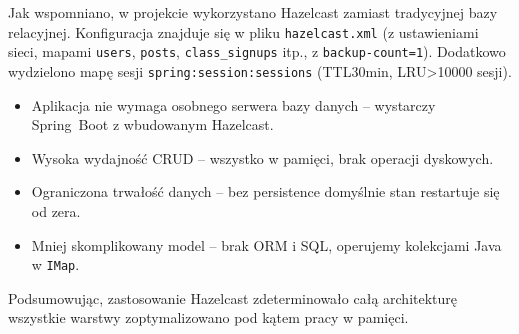 Jak wspomniano, w projekcie wykorzystano Hazelcast zamiast tradycyjnej
bazy relacyjnej. Konfiguracja znajduje się w pliku \texttt{hazelcast.xml}
(z ustawieniami sieci, mapami
\texttt{users}, \texttt{posts}, \texttt{class\_signups} itp., z
\texttt{backup-count=1}). Dodatkowo wydzielono mapę sesji
\texttt{spring:session:sessions} (TTL30min, LRU>10000 sesji).

\begin{itemize}
  \item Aplikacja nie wymaga osobnego serwera bazy danych – wystarczy
    Spring Boot z wbudowanym Hazelcast.
  \item Wysoka wydajność CRUD – wszystko w pamięci, brak operacji dyskowych.
  \item Ograniczona trwałość danych – bez persistence domyślnie stan
    restartuje się od zera.
  \item Mniej skomplikowany model – brak ORM i SQL, operujemy kolekcjami
    Java w \texttt{IMap}.
\end{itemize}

Podsumowując, zastosowanie Hazelcast zdeterminowało całą architekturę
wszystkie warstwy zoptymalizowano pod kątem pracy w pamięci.